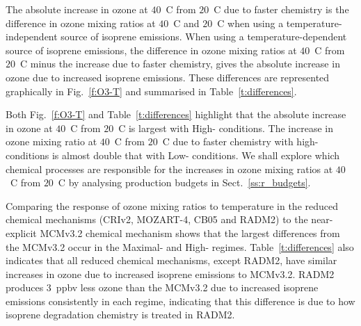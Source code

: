 The absolute increase in ozone at $40$~\degree C from $20$~\degree C due to faster chemistry is the difference in ozone mixing ratios at $40$~\degree C and $20$~\degree C when using a temperature-independent source of isoprene emissions.
When using a temperature-dependent source of isoprene emissions, the difference in ozone mixing ratios at $40$~\degree C from $20$~\degree C minus the increase due to faster chemistry, gives the absolute increase in ozone due to increased isoprene emissions.
These differences are represented graphically in Fig.~\ref{f:O3-T} and summarised in Table~\ref{t:differences}.

Both Fig.~\ref{f:O3-T} and Table~\ref{t:differences} highlight that the absolute increase in ozone at $40$~\degree C from $20$~\degree C is largest with High- conditions.
The increase in ozone mixing ratio at $40$~\degree C from $20$~\degree C due to faster chemistry with high- conditions is almost double that with Low- conditions.
We shall explore which chemical processes are responsible for the increases in ozone mixing ratios at $40$~\degree C from $20$~\degree C by analysing  production budgets in Sect.~\ref{ss:r_budgets}.

Comparing the response of ozone mixing ratios to temperature in the reduced chemical mechanisms (CRIv2, MOZART-4, CB05 and RADM2) to the near-explicit MCMv3.2 chemical mechanism shows that the largest differences from the MCMv3.2 occur in the Maximal- and High- regimes.
Table~\ref{t:differences} also indicates that all reduced chemical mechanisms, except RADM2, have similar increases in ozone due to increased isoprene emissions to MCMv3.2.
RADM2 produces $3$~ppbv less ozone than the MCMv3.2 due to increased isoprene emissions consistently in each  regime, indicating that this difference is due to how isoprene degradation chemistry is treated in RADM2.


